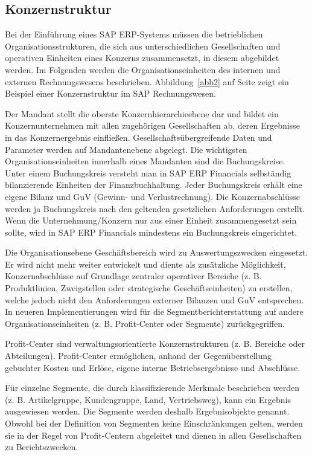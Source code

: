 \subsection{Konzernstruktur}
Bei der Einführung eines SAP ERP-Systems müssen die betrieblichen Organisationsstrukturen, die sich aus unterschiedlichen Gesellschaften und operativen Einheiten eines Konzerns zusammensetzt, in diesem abgebildet werden.
Im Folgenden werden die Organisationseinheiten des internen und externen Rechnungswesens beschrieben. Abbildung~\ref{abb2} auf Seite \pageref{abb2} zeigt ein Beispiel einer Konzernstruktur im SAP Rechnungswesen.

Der Mandant stellt die oberste Konzernhierarchieebene dar und bildet ein Konzernunternehmen mit allen zugehörigen Gesellschaften ab, deren Ergebnisse in das Konzernergebnis einfließen. Gesellschaftsübergreifende Daten und Parameter werden auf Mandantenebene abgelegt.
Die wichtigsten Organisationseinheiten innerhalb eines Mandanten sind die Buchungskreise. Unter einem Buchungskreis versteht man in SAP ERP Financials selbständig bilanzierende Einheiten der Finanzbuchhaltung. Jeder Buchungskreis erhält eine eigene Bilanz und GuV (Gewinn- und Verlustrechnung). Die Konzernabschlüsse werden ja Buchungskreis nach den geltenden gesetzlichen Anforderungen erstellt. Wenn die Unternehmung/Konzern nur aus einer Einheit zusammengesetzt sein sollte, wird in SAP ERP Financials mindestens ein Buchungskreis eingerichtet.

Die Organisationsebene Geschäftsbereich wird zu Auswertungszwecken eingesetzt. Er wird nicht mehr weiter entwickelt und diente als zusätzliche Möglichkeit, Konzernabschlüsse auf Grundlage zentraler operativer Bereiche (z. B. Produktlinien, Zweigstellen oder strategische Geschäftseinheiten) zu erstellen, welche jedoch nicht den Anforderungen externer Bilanzen und GuV entsprechen. In neueren Implementierungen wird für die Segmentberichterstattung auf andere Organisationseinheiten (z. B. Profit-Center oder Segmente) zurückgegriffen.

Profit-Center sind verwaltungsorientierte Konzernstrukturen (z. B. Bereiche oder Abteilungen). Profit-Center ermöglichen, anhand der Gegenüberstellung gebuchter Kosten und Erlöse, eigene interne Betriebsergebnisse und Abschlüsse.

Für einzelne Segmente, die durch klassifizierende Merkmale beschrieben werden (z. B. Artikelgruppe, Kundengruppe, Land, Vertriebsweg), kann ein Ergebnis ausgewiesen werden. Die Segmente werden deshalb Ergebnisobjekte genannt. Obwohl bei der Definition von Segmenten keine Einschränkungen gelten, werden sie in der Regel von Profit-Centern abgeleitet und dienen in allen Gesellschaften zu Berichtszwecken. 

